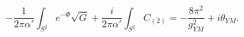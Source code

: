 \begin{equation}
-\frac{1}{2\pi \alpha' } \int_{S^2} e^{-\Phi}\sqrt{G} +\frac{i}{2\pi \alpha' } \int_{S^2} C_{(2)} = - \frac{8\pi^2}{g^2_{YM}} + i \theta_{YM}.
\label{coup}
\end{equation}

